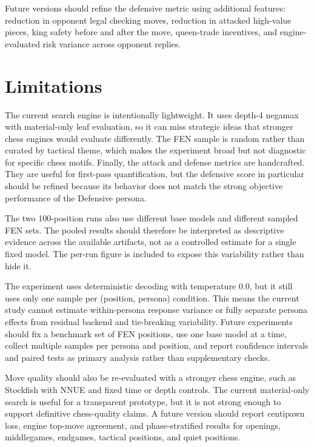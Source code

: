 \documentclass[10pt]{article}
\begin{document}
Future versions should refine the defensive metric using additional features: reduction in opponent legal checking moves, reduction in attacked high-value pieces, king safety before and after the move, queen-trade incentives, and engine-evaluated risk variance across opponent replies.

\section{Limitations}

The current search engine is intentionally lightweight. It uses depth-4 negamax with material-only leaf evaluation, so it can miss strategic ideas that stronger chess engines would evaluate differently. The FEN sample is random rather than curated by tactical theme, which makes the experiment broad but not diagnostic for specific chess motifs. Finally, the attack and defense metrics are handcrafted. They are useful for first-pass quantification, but the defensive score in particular should be refined because its behavior does not match the strong objective performance of the Defensive persona.

The two 100-position runs also use different base models and different sampled FEN sets. The pooled results should therefore be interpreted as descriptive evidence across the available artifacts, not as a controlled estimate for a single fixed model. The per-run figure is included to expose this variability rather than hide it.

The experiment uses deterministic decoding with temperature 0.0, but it still uses only one sample per (position, persona) condition. This means the current study cannot estimate within-persona response variance or fully separate persona effects from residual backend and tie-breaking variability. Future experiments should fix a benchmark set of FEN positions, use one base model at a time, collect multiple samples per persona and position, and report confidence intervals and paired tests as primary analysis rather than supplementary checks.

Move quality should also be re-evaluated with a stronger chess engine, such as Stockfish with NNUE and fixed time or depth controls. The current material-only search is useful for a transparent prototype, but it is not strong enough to support definitive chess-quality claims. A future version should report centipawn loss, engine top-move agreement, and phase-stratified results for openings, middlegames, endgames, tactical positions, and quiet positions.
\end{document}
